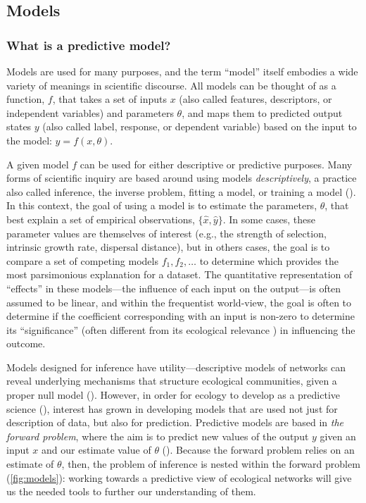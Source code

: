 \begin{refsection}
\subsection{Models}\label{models}

\subsubsection{What is a predictive
model?}\label{what-is-a-predictive-model}

Models are used for many purposes, and the term ``model'' itself
embodies a wide variety of meanings in scientific discourse. All models
can be thought of as a function, \(f\), that takes a set of inputs \(x\)
(also called features, descriptors, or independent variables) and
parameters \(\theta\), and maps them to predicted output states \(y\)
(also called label, response, or dependent variable) based on the input
to the model: \(y=f(x,\theta)\).

A given model \(f\) can be used for either descriptive or predictive
purposes. Many forms of scientific inquiry are based around using models
\emph{descriptively}, a practice also called inference, the inverse
problem, fitting a model, or training a model (\cite{Stouffer2019AllEco}).
In this context, the goal of using a model is to estimate the
parameters, \(\theta\), that best explain a set of empirical
observations, \(\{\hat{x}, \hat{y}\}\). In some cases, these parameter
values are themselves of interest (e.g., the strength of selection,
intrinsic growth rate, dispersal distance), but in others cases, the
goal is to compare a set of competing models \(f_1, f_2, \dots\) to
determine which provides the most parsimonious explanation for a
dataset. The quantitative representation of ``effects'' in these
models---the influence of each input on the output---is often assumed to
be linear, and within the frequentist world-view, the goal is often to
determine if the coefficient corresponding with an input is non-zero to
determine its ``significance'' (often different from its ecological
relevance \cite{Martinez-Abrain2008StaSig}) in influencing the outcome.

Models designed for inference have utility---descriptive models of
networks can reveal underlying mechanisms that structure ecological
communities, given a proper null model (\cite{Connor2017UsiNul}). However,
in order for ecology to develop as a predictive science
(\cite{Evans2012PreEco}), interest has grown in developing models that are
used not just for description of data, but also for prediction.
Predictive models are based in \emph{the forward problem}, where the aim
is to predict new values of the output \(y\) given an input \(x\) and
our estimate value of \(\theta\) (\cite{Stouffer2019AllEco}). Because the
forward problem relies on an estimate of \(\theta\), then, the problem
of inference is nested within the forward problem (\autoref{fig:models}): working
towards a predictive view of ecological networks will give us the needed
tools to further our understanding of them.


\end{refsection}
